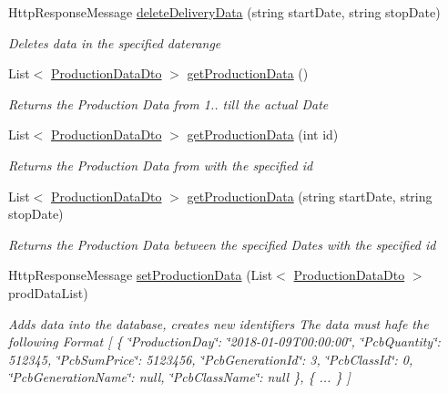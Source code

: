 \begin{DoxyCompactItemize}
Http\+Response\+Message \hyperlink{classkpi_mvc_api_1_1_controllers_1_1_kpidata_controller_afa78742271a206304b8daa11cb747bde}{delete\+Delivery\+Data} (string start\+Date, string stop\+Date)
\begin{DoxyCompactList}\small\item\em Deletes data in the specified daterange \end{DoxyCompactList}\item 
List$<$ \hyperlink{classkpi_mvc_api_1_1_data_transfer_objects_1_1_production_data_dto}{Production\+Data\+Dto} $>$ \hyperlink{classkpi_mvc_api_1_1_controllers_1_1_kpidata_controller_a0ab15672f7d3b5a077a8c4b0612feab8}{get\+Production\+Data} ()
\begin{DoxyCompactList}\small\item\em Returns the Production Data from 1.. till the actual Date \end{DoxyCompactList}\item 
List$<$ \hyperlink{classkpi_mvc_api_1_1_data_transfer_objects_1_1_production_data_dto}{Production\+Data\+Dto} $>$ \hyperlink{classkpi_mvc_api_1_1_controllers_1_1_kpidata_controller_a2cc4fffc5f66a92f16f917715cb36d0e}{get\+Production\+Data} (int id)
\begin{DoxyCompactList}\small\item\em Returns the Production Data from with the specified id \end{DoxyCompactList}\item 
List$<$ \hyperlink{classkpi_mvc_api_1_1_data_transfer_objects_1_1_production_data_dto}{Production\+Data\+Dto} $>$ \hyperlink{classkpi_mvc_api_1_1_controllers_1_1_kpidata_controller_a27722d65abe0781d4b670c84c2e07a76}{get\+Production\+Data} (string start\+Date, string stop\+Date)
\begin{DoxyCompactList}\small\item\em Returns the Production Data between the specified Dates with the specified id \end{DoxyCompactList}\item 
Http\+Response\+Message \hyperlink{classkpi_mvc_api_1_1_controllers_1_1_kpidata_controller_a7f6c6c359f37a9b9a83d481b5c26a037}{set\+Production\+Data} (List$<$ \hyperlink{classkpi_mvc_api_1_1_data_transfer_objects_1_1_production_data_dto}{Production\+Data\+Dto} $>$ prod\+Data\+List)
\begin{DoxyCompactList}\small\item\em Adds data into the database, creates new identifiers The data must hafe the following Format \mbox{[} \{ \char`\"{}\+Production\+Day\char`\"{}\+: \char`\"{}2018-\/01-\/09\+T00\+:00\+:00\char`\"{}, \char`\"{}\+Pcb\+Quantity\char`\"{}\+: 512345, \char`\"{}\+Pcb\+Sum\+Price\char`\"{}\+: 5123456, \char`\"{}\+Pcb\+Generation\+Id\char`\"{}\+: 3, \char`\"{}\+Pcb\+Class\+Id\char`\"{}\+: 0, \char`\"{}\+Pcb\+Generation\+Name\char`\"{}\+: null, \char`\"{}\+Pcb\+Class\+Name\char`\"{}\+: null \}, \{ ... \} \mbox{]} \end{DoxyCompactList}\item 

\end{DoxyCompactItemize}
